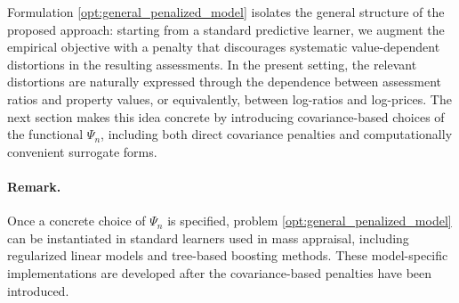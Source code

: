 \documentclass[12pt, draft]{article}
\theoremstyle{plain}
\theoremstyle{definition}
\newcommand{\1}{\mathbf{1}}
\begin{document}
{Formulation \eqref{opt:general_penalized_model} isolates the general structure of the proposed approach: starting from a standard predictive learner, we augment the empirical objective with a penalty that discourages systematic value-dependent distortions in the resulting assessments. In the present setting, the relevant distortions are naturally expressed through the dependence between assessment ratios and property values, or equivalently, between log-ratios and log-prices. The next section makes this idea concrete by introducing covariance-based choices of the functional $\Psi_n$, including both direct covariance penalties and computationally convenient surrogate forms.

\paragraph{Remark.}
Once a concrete choice of $\Psi_n$ is specified, problem \eqref{opt:general_penalized_model} can be instantiated in standard learners used in mass appraisal, including regularized linear models and tree-based boosting methods. These model-specific implementations are developed after the covariance-based penalties have been introduced.
}




\end{document}
